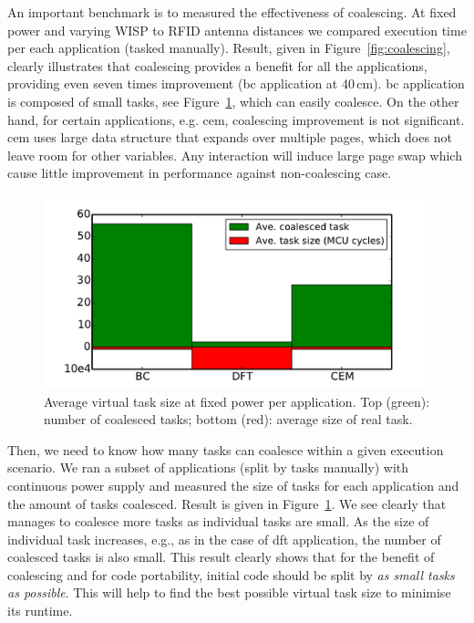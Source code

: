 An important benchmark is to measured the effectiveness of \sys coalescing. At fixed power and varying WISP to RFID antenna distances we compared \sys execution time per each application (tasked manually). Result, given in Figure~\ref{fig:coalescing}, clearly illustrates that coalescing provides a benefit for all the applications, providing even seven times improvement (bc application at 40\,cm). bc application is composed of small tasks, see Figure~\ref{fig:aveVirtuTaskSize}, which \sys can easily coalesce. On the other hand, for certain applications, e.g. cem, coalescing improvement is not significant. cem uses large data structure that expands over multiple pages, which does not leave room for other variables. Any interaction will induce large page swap which cause little improvement in \sys performance against non-coalescing case. 

\begin{figure}
	\centering
	\includegraphics[width=\columnwidth]{figures/averageVirtualTaskSize}
	\caption{Average \sys virtual task size at fixed power per application. Top (green): number of coalesced tasks; bottom (red): average size of real task.}
	\label{fig:aveVirtuTaskSize}
\end{figure}

Then, we need to know how many tasks \sys can coalesce within a given execution scenario. We ran a subset of applications (split by tasks manually) with continuous power supply and measured the size of tasks for each application and the amount of tasks coalesced. Result is given in Figure~\ref{fig:aveVirtuTaskSize}. We see clearly that \sys manages to coalesce more tasks as individual tasks are small. As the size of individual task increases, e.g., as in the case of dft application, the number of coalesced tasks is also small. This result clearly shows that for the benefit of coalescing and for code portability, initial code should be split by \emph{as small tasks as possible}. This will help \sys to find the best possible virtual task size to minimise its runtime.

